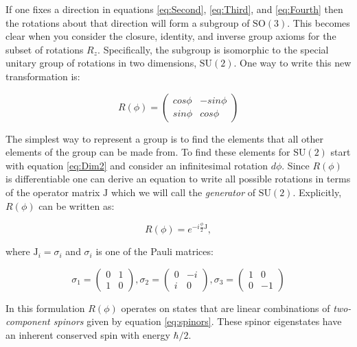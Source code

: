 If one fixes a direction in equations \ref{eq:Second}, \ref{eq:Third}, and \ref{eq:Fourth} then the rotations about that direction will form a subgroup of $\mathrm{SO}(3)$. This becomes clear when you consider the closure, identity, and inverse group axioms for the subset of rotations $R_{z}$. Specifically, the subgroup is isomorphic to the special unitary group of rotations in two dimensions, $\mathrm{SU}(2)$. One way to write this new transformation is: 

\begin{equation}
\label{eq:Dim2}
R(\phi) = \left( \begin{array}{cc}
cos\phi & -sin\phi \\
sin\phi & cos\phi \end{array} \right)
\end{equation}

The simplest way to represent a group is to find the elements that all other elements of the group can be made from. To find these elements for $\mathrm{SU}(2)$ start with equation \ref{eq:Dim2} and consider an infinitesimal rotation $d\phi$. Since $R(\phi)$ is differentiable one can derive an equation to write all possible rotations in terms of the operator matrix $\mathrm{J}$ which we will call the \textit{generator} of $\mathrm{SU}(2)$. Explicitly, $R(\phi)$ can be written as:

\begin{equation}
\label{eq:generator}
R(\phi) = e^{-i \frac{\phi}{2} \mathrm{J}},
\end{equation}

where $\mathrm{J}_{i} = \sigma_{i}$ and $\sigma_{i}$ is one of the Pauli matrices:

\begin{equation}
\label{eq:Pauli}
\sigma_{1} = \begin{pmatrix}
    0 & 1\\
    1 & 0
  \end{pmatrix}, \sigma_{2} = \begin{pmatrix}
    0 & -i\\
    i & 0
  \end{pmatrix}, \sigma_{3} = \begin{pmatrix}
    1 & 0\\
    0 & -1
  \end{pmatrix}
  \end{equation}


In this formulation $R(\phi)$ operates on states that are linear combinations of \textit{two-component spinors} given by equation \ref{eq:spinors}. These spinor eigenstates have an inherent conserved spin with energy $\hbar/2$. 

